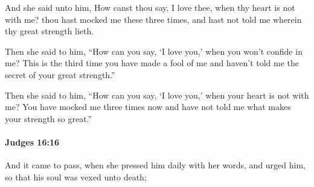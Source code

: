 			\begin{versebox}
					\item[BHS] 
					\item[ASV] And she said unto him, How canst thou say, I love thee, when thy heart is not with me? thou hast mocked me these three times, and hast not told me wherein thy great strength lieth.
					\item[NIV] Then she said to him, “How can you say, ‘I love you,’ when you won’t confide in me? This is the third time you have made a fool of me and haven’t told me the secret of your great strength.”
					\item[NRSV] Then she said to him, “How can you say, ‘I love you,’ when your heart is not with me? You have mocked me three times now and have not told me what makes your strength so great.”
			\end{versebox}

		\paragraph{Judges 16:16} %
			\label{JUDGES-16-16}

			And it came to pass, when she pressed him daily with her words, and urged him, so that his soul was vexed unto death;

